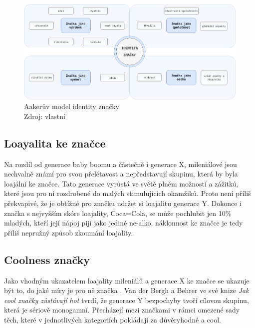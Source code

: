 \medskip
\begin{figure}[htbp!]
    \centering
    \includegraphics[width=.95\textwidth]{assets/aaker-model.png}
    \caption[Aakerův model identity značky]{Aakerův model identity značky \\ Zdroj: vlastní}
    \label{fig:aaker-brand-identity-model}
\end{figure}

\subsection{Loayalita ke značce}
Na rozdíl od generace baby boomu a částečně i generace X, mileniálové jsou nechvalně známí pro svou přelétavost a nepředstavují skupinu, která by byla loajální ke značce. Tato generace vyrůstá ve světě plném možností a zážitků, které jsou pro ni rozdrobené do malých stimulujících okamžiků. Proto není příliš překvapivé, že je obtížné pro značku udržet si loajalitu generace Y. Dokonce i značka s nejvyšším skóre loajality, Coca=Cola, se může pochlubit jen 10\rm \% mladých, kteří její nápoj pijí jako jediné ne-alko.  náklonnost ke značce je tedy příliš nepružný způsob zkoumání loajality.\cite{bergh2012coolznacky}

\subsection*{Coolness značky}
Jako vhodným ukazatelem loajality mileniálů a generace X ke značce se ukazuje být to, do jaké míry je pro ně značka . Van der Bergh a Behrer ve své knize \textit{Jak cool značky zůstávají hot} tvrdí, že generace Y bezpochyby tvoří cílovou skupinu, která je sériově monogamní. Přecházejí mezi značkami v rámci omezené sady těch, které v jednotlivých kategoriích pokládají za důvěryhodné a cool.\cite[s. 90]{bergh2012coolznacky}

